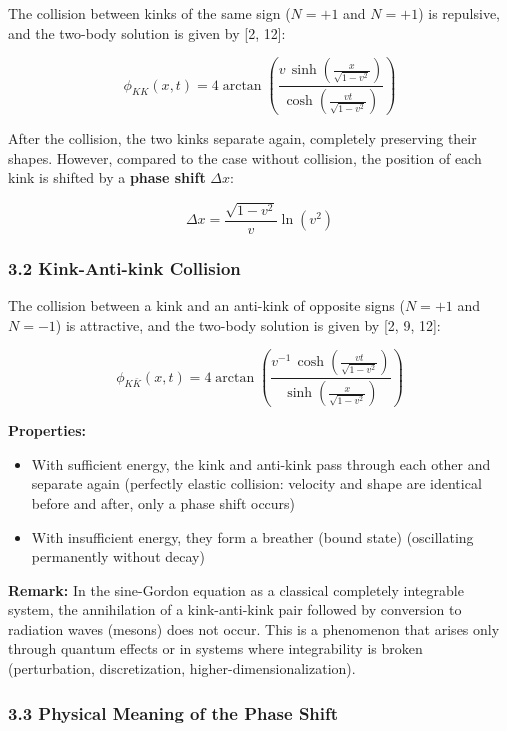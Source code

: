 \documentclass[a4paper,11pt]{article}
\providecommand{\tightlist}{\setlength{\itemsep}{0pt}\setlength{\parskip}{0pt}}
\begin{document}
The collision between kinks of the same sign (\(N = +1\) and \(N = +1\))
is repulsive, and the two-body solution is given by {[}2, 12{]}:

\[\phi_{KK}(x, t) = 4\arctan\left(\frac{v\,\sinh\left(\frac{x}{\sqrt{1-v^2}}\right)}{\cosh\left(\frac{vt}{\sqrt{1-v^2}}\right)}\right)\]

After the collision, the two kinks separate again, completely preserving
their shapes. However, compared to the case without collision, the
position of each kink is shifted by a \textbf{phase shift} \(\Delta x\):

\[\Delta x = \frac{\sqrt{1 - v^2}}{v}\ln(v^2)\]

\subsubsection{3.2 Kink-Anti-kink
Collision}\label{kink-anti-kink-collision}

The collision between a kink and an anti-kink of opposite signs
(\(N = +1\) and \(N = -1\)) is attractive, and the two-body solution is
given by {[}2, 9, 12{]}:

\[\phi_{K\bar{K}}(x, t) = 4\arctan\left(\frac{v^{-1}\,\cosh\left(\frac{vt}{\sqrt{1-v^2}}\right)}{\sinh\left(\frac{x}{\sqrt{1-v^2}}\right)}\right)\]

\textbf{Properties:}

\begin{itemize}
\tightlist
\item
  With sufficient energy, the kink and anti-kink pass through each other
  and separate again (perfectly elastic collision: velocity and shape
  are identical before and after, only a phase shift occurs)
\item
  With insufficient energy, they form a breather (bound state)
  (oscillating permanently without decay)
\end{itemize}

\textbf{Remark:} In the sine-Gordon equation as a classical completely
integrable system, the annihilation of a kink-anti-kink pair followed by
conversion to radiation waves (mesons) does not occur. This is a
phenomenon that arises only through quantum effects or in systems where
integrability is broken (perturbation, discretization,
higher-dimensionalization).

\subsubsection{3.3 Physical Meaning of the Phase
Shift}\label{physical-meaning-of-the-phase-shift}
\end{document}
